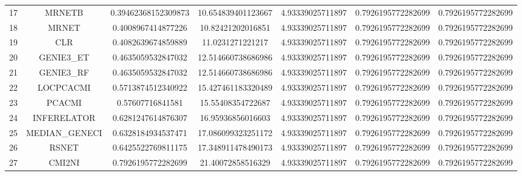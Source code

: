 \documentclass[a4paper,10pt]{article}
\begin{document}
\begin{landscape}
\begin{table}[!htp]
\begin{tabular}{ccccccc}
17&MRNETB&0.39462368152309873&10.654839401123667&4.93339025711897&0.7926195772282699&0.7926195772282699\\
18&MRNET&0.4008967414877226&10.82421202016851&4.93339025711897&0.7926195772282699&0.7926195772282699\\
19&CLR&0.4082639674859889&11.0231271221217&4.93339025711897&0.7926195772282699&0.7926195772282699\\
20&GENIE3_ET&0.4635059532847032&12.514660738686986&4.93339025711897&0.7926195772282699&0.7926195772282699\\
21&GENIE3_RF&0.4635059532847032&12.514660738686986&4.93339025711897&0.7926195772282699&0.7926195772282699\\
22&LOCPCACMI&0.5713874512340922&15.427461183320489&4.93339025711897&0.7926195772282699&0.7926195772282699\\
23&PCACMI&0.57607716841581&15.55408354722687&4.93339025711897&0.7926195772282699&0.7926195772282699\\
24&INFERELATOR&0.6281247614876307&16.95936856016603&4.93339025711897&0.7926195772282699&0.7926195772282699\\
25&MEDIAN_GENECI&0.6328184934537471&17.086099323251172&4.93339025711897&0.7926195772282699&0.7926195772282699\\
26&RSNET&0.6425522769811175&17.348911478490173&4.93339025711897&0.7926195772282699&0.7926195772282699\\
27&CMI2NI&0.7926195772282699&21.40072858516329&4.93339025711897&0.7926195772282699&0.7926195772282699\\
\hline
\end{tabular}
\end{table}


\end{landscape}
\end{document}
